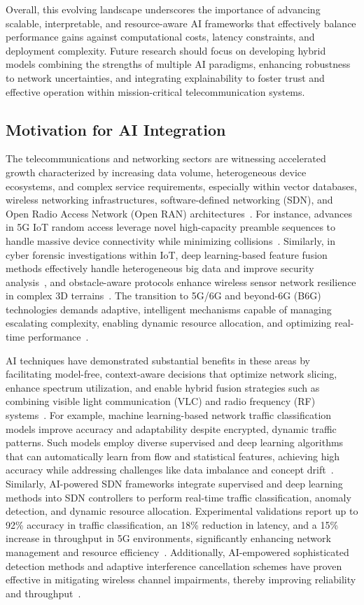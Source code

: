 \documentclass[sigconf]{acmart}
\begin{document}
Overall, this evolving landscape underscores the importance of advancing scalable, interpretable, and resource-aware AI frameworks that effectively balance performance gains against computational costs, latency constraints, and deployment complexity. Future research should focus on developing hybrid models combining the strengths of multiple AI paradigms, enhancing robustness to network uncertainties, and integrating explainability to foster trust and effective operation within mission-critical telecommunication systems.

\subsection{Motivation for AI Integration}

The telecommunications and networking sectors are witnessing accelerated growth characterized by increasing data volume, heterogeneous device ecosystems, and complex service requirements, especially within vector databases, wireless networking infrastructures, software-defined networking (SDN), and Open Radio Access Network (Open RAN) architectures~\cite{ref21,ref22,ref23}. For instance, advances in 5G IoT random access leverage novel high-capacity preamble sequences to handle massive device connectivity while minimizing collisions~\cite{ref21}. Similarly, in cyber forensic investigations within IoT, deep learning-based feature fusion methods effectively handle heterogeneous big data and improve security analysis~\cite{ref22}, and obstacle-aware protocols enhance wireless sensor network resilience in complex 3D terrains~\cite{ref23}. The transition to 5G/6G and beyond-6G (B6G) technologies demands adaptive, intelligent mechanisms capable of managing escalating complexity, enabling dynamic resource allocation, and optimizing real-time performance~\cite{ref24,ref25}. 

AI techniques have demonstrated substantial benefits in these areas by facilitating model-free, context-aware decisions that optimize network slicing, enhance spectrum utilization, and enable hybrid fusion strategies such as combining visible light communication (VLC) and radio frequency (RF) systems~\cite{ref51,ref52}. For example, machine learning-based network traffic classification models improve accuracy and adaptability despite encrypted, dynamic traffic patterns. Such models employ diverse supervised and deep learning algorithms that can automatically learn from flow and statistical features, achieving high accuracy while addressing challenges like data imbalance and concept drift~\cite{ref51}. Similarly, AI-powered SDN frameworks integrate supervised and deep learning methods into SDN controllers to perform real-time traffic classification, anomaly detection, and dynamic resource allocation. Experimental validations report up to 92\% accuracy in traffic classification, an 18\% reduction in latency, and a 15\% increase in throughput in 5G environments, significantly enhancing network management and resource efficiency~\cite{ref52}. Additionally, AI-empowered sophisticated detection methods and adaptive interference cancellation schemes have proven effective in mitigating wireless channel impairments, thereby improving reliability and throughput~\cite{ref54,ref55}. 
\end{document}

